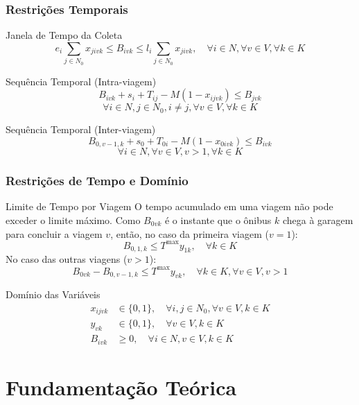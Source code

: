 \documentclass[10pt]{beamer}
\begin{document}
\begin{frame}
\frametitle{Restrições Temporais}
\begin{block}{Janela de Tempo da Coleta}
$$e_i \sum_{j \in N_0} x_{jivk} \leq B_{ivk} \leq l_i \sum_{j \in N_0} x_{jivk}, \quad \forall i \in N, \forall v \in V, \forall k \in K$$
\end{block}

\begin{block}{Sequência Temporal (Intra-viagem)}
$$B_{ivk} + s_i + T_{ij} - M(1 - x_{ijvk}) \leq B_{jvk}$$
$$\forall i \in N, j \in N_0, i \neq j, \forall v \in V, \forall k \in K$$
\end{block}

\begin{block}{Sequência Temporal (Inter-viagem)}
$$B_{0,v-1,k} + s_0 + T_{0i} - M(1 - x_{0ivk}) \leq B_{ivk}$$
$$\forall i \in N, \forall v \in V, v > 1, \forall k \in K$$
\end{block}
\end{frame}

\begin{frame}
\frametitle{Restrições de Tempo e Domínio}
\begin{block}{Limite de Tempo por Viagem}
O tempo acumulado em uma viagem não pode exceder o limite máximo. Como $B_{0vk}$ é o instante que o ônibus $k$ chega à garagem para concluir a viagem $v$, então, no caso da primeira viagem ($v=1$):
$$ B_{0,1,k} \leq T^{\max} y_{1k}, \quad \forall k \in K$$
No caso das outras viagens ($v>1$):
$$ B_{0vk} - B_{0,v-1,k} \leq T^{\max} y_{vk}, \quad \forall k \in K, \forall v \in V, v > 1$$
\end{block}

\begin{block}{Domínio das Variáveis}
\begin{align}
x_{ijvk} &\in \{0, 1\}, \quad \forall i,j \in N_0, \forall v \in V, k \in K \\
y_{vk} &\in \{0, 1\}, \quad \forall v \in V, k \in K \\
B_{ivk} &\geq 0, \quad \forall i \in N, v \in V, k \in K
\end{align}
\end{block}
\end{frame}

\section{Fundamentação Teórica}
\end{document}
